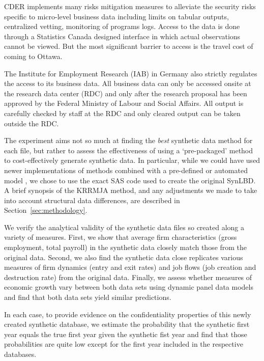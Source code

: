 CDER implements many risks mitigation measures to alleviate the security risks specific to micro-level business data including limits on tabular outputs, centralized vetting, monitoring of programs logs. Access to the data is done through a Statistics Canada designed interface in which actual observations cannot be viewed. But the most significant barrier to access is the travel cost of coming to Ottawa.

The Institute for Employment Research (IAB) in Germany also strictly regulates the access to its business data. All business data can only be accessed onsite at the research data center (RDC) and only after the research proposal has been approved by the Federal Ministry of Labour and Social Affairs. All output is carefully checked by staff at the RDC and only cleared output can be taken outside the RDC. 

The experiment aims not so much at finding the \textit{best} synthetic data method for each file, but rather to assess the effectiveness of using a `pre-packaged' method to cost-effectively generate synthetic data. In particular, while we could have used newer implementations of methods combined with a pre-defined or automated model \citep{JSSv074i11,Raab_Nowok_Dibben_2018}, we chose to use the exact SAS code used to create the original \ac{SynLBD}. A brief synopsis of the KRRMJA method, and any adjustments we made to take into account structural data differences, are described in Section~\ref{sec:methodology}.



We verify the analytical validity of the synthetic data files so created along a variety of measures. First, we show that average firm characteristics (gross employment, total payroll) in the synthetic data closely match those from the original data. Second, we also find the synthetic data close replicates various measures of firm dynamics (entry and exit rates) and job flows (job creation and destruction rate) from the original data. Finally, we assess whether measures of economic growth vary between both data sets using dynamic panel data models and find that both data sets yield similar predictions.

In each case, to provide evidence on the confidentiality properties of this newly created synthetic database, we estimate the probability that the synthetic first year equals the true first year given the synthetic fist year and find that those probabilities are quite low except for the first year included in the respective databases. 

